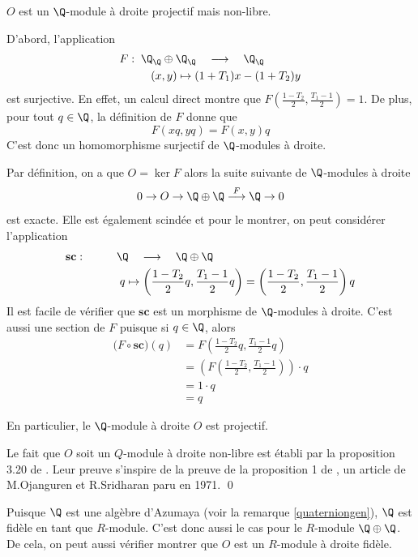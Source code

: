 \begin{Prop} \label{projnonlibre} $O$ est un $\Q$-module à droite projectif mais non-libre.

\begin{pre} D'abord, l'application
\begin{align*} 
F : \; \Q_\Q &\oplus \Q_\Q \quad \longrightarrow \quad \Q_\Q\\
(x&,y) \mapsto (1+T_1)x - (1+T_2)y
\end{align*}
est surjective. En effet, un calcul direct montre que $F\left(\frac{1-T_2}{2},\frac{T_1-1}{2}\right) = 1$. De plus, pour tout $q \in \Q$, la définition de $F$ donne que 
$$ F(xq,yq) = F(x,y)q $$ 
C'est donc un homomorphisme surjectif de $\Q$-modules à droite.

Par définition, on a que $O = \ker F$ alors la suite suivante de $\Q$-modules à droite
$$ 0 \rightarrow O \rightarrow \Q \oplus \Q \stackrel{F}{\longrightarrow}\Q \rightarrow 0 $$
est exacte. Elle est également scindée et pour le montrer, on peut considérer l'application 
\begin{align*}
\mathbf{sc} : \qquad \quad &\Q \quad \longrightarrow \quad \Q \oplus \Q\\
&\;q \mapsto \left(\frac{1-T_2}{2} q,\frac{T_1-1}{2} q\right) = \left(\frac{1-T_2}{2},\frac{T_1-1}{2}\right)q
\end{align*}
Il est facile de vérifier que $\mathbf{sc}$ est un morphisme de $\Q$-modules à droite. C'est aussi une section de $F$ puisque si $q \in \Q$, alors 
\begin{align*}
\big(F \circ \mathbf{sc}\big)(q) &= F\left(\frac{1-T_2}{2} q,\frac{T_1-1}{2} q\right)\\
&= \left(F\left(\frac{1-T_2}{2},\frac{T_1-1}{2}\right)\right) \cdot q\\
&= 1 \cdot q\\
&= q
\end{align*}

En particulier, le $\Q$-module à droite $O$ est projectif.

Le fait que $O$ soit un $Q$-module à droite non-libre est établi par la proposition 3.20 de \cite{GPmar}. Leur preuve s'inspire de la preuve de la proposition 1 de \cite{OSproj}, un article de M.Ojanguren et R.Sridharan paru en 1971. \qed
\end{pre}
\end{Prop}

\begin{Rem} \label{modfidele} Puisque $\Q$ est une algèbre d'Azumaya (voir la remarque \ref{quaterniongen}), $\Q$ est fidèle en tant que $R$-module. C'est donc aussi le cas pour le $R$-module $\Q \oplus \Q$. De cela, on peut aussi vérifier montrer que $O$ est un $R$-module à droite fidèle. 
\end{Rem}

